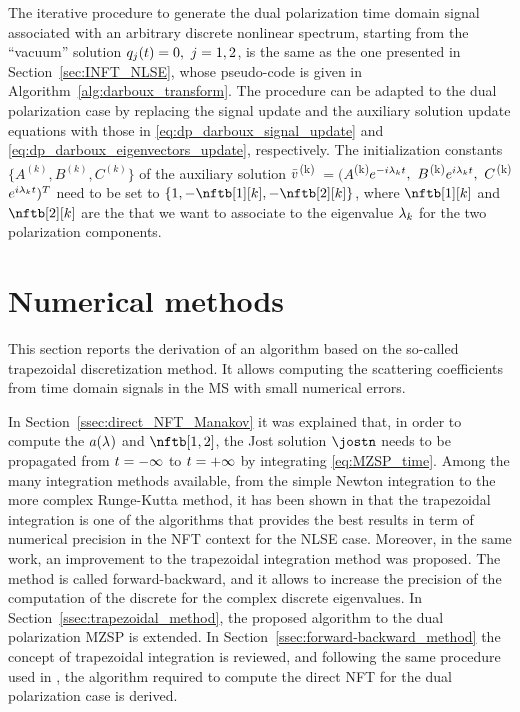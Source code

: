 The iterative procedure to generate the dual polarization time domain  signal associated with an arbitrary discrete nonlinear spectrum, starting from the ``vacuum'' solution $\nflds[j]=0,~j=1,2$, is the same as the one presented in Section~\ref{sec:INFT_NLSE}, whose pseudo-code is given in Algorithm~\ref{alg:darboux_transform}. The procedure can be adapted to the dual polarization case by replacing the signal update and the auxiliary solution update equations with those in \eqref{eq:dp_darboux_signal_update} and \eqref{eq:dp_darboux_eigenvectors_update}, respectively. The initialization constants $\{A^{(k)}, B^{(k)}, C^{(k)}\}$ of the auxiliary solution $\auxsol$\textsuperscript{(k)} $=(A$\textsuperscript{(k)}$e^{-i\eig[k] t},~B$\textsuperscript{(k)}$e^{i\eig[k] t},~C$\textsuperscript{(k)}$e^{i\eig[k] t})^T$ need to be set to $\left\{1,-\nftb[1][k],-\nftb[2][k]\right\}$, where $\nftb[1][k]$ and $\nftb[2][k]$ are the \scatcoef{} that we want to associate to the eigenvalue $\eig[k]$ for the two polarization components.



\section{Numerical methods}\label{sec:numerical_methods}
This section reports the derivation of an algorithm based on the so-called trapezoidal discretization method. It allows computing the scattering coefficients from time domain signals in the \ac{MS} with small numerical errors.

In Section~\ref{ssec:direct_NFT_Manakov} it was explained that, in order to compute the \scatcoef{} $\nfta$ and $\nftb[1,2]$,  the Jost
solution $\jostn$ needs to be propagated from $\nttm=-\infty$ to $\nttm=+\infty$ by integrating \eqref{eq:MZSP_time}. Among the many integration methods available, from the simple
Newton
integration to the more complex Runge-Kutta method, it has been shown in \cite{Aref2016c} that the trapezoidal integration is one of the algorithms that provides the best
results in term of numerical precision in the \ac{NFT} context for the \ac{NLSE}
case. Moreover, in the same work, an improvement  to the
trapezoidal integration method was proposed. The method is called forward-backward, and it allows to
increase the precision of the computation of the discrete \scatcoef{} for the complex
discrete eigenvalues. In  Section~\ref{ssec:trapezoidal_method}, the
proposed algorithm to the dual polarization \ac{MZSP} is extended.
In Section~\ref{ssec:forward-backward_method} the concept of trapezoidal
integration is reviewed, and following the same procedure used in
\cite{Aref2016c},
the algorithm required to compute the direct \ac{NFT} for the dual polarization case is derived.


